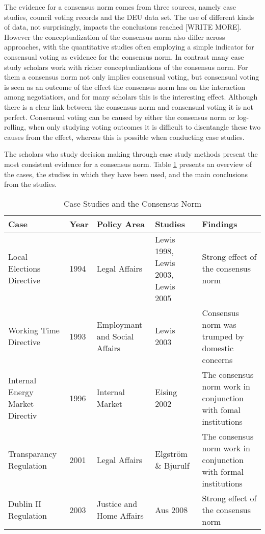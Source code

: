 The evidence for a consensus norm comes from three sources, namely case studies, council voting records and the DEU data set. The use of different kinds of data, not surprisingly, impacts the conclusions reached [WRITE MORE]. However the conceptualization of the consensus norm also differ across approaches, with the quantitative studies often employing a simple indicator for consensual voting as evidence for the consensus norm. In contrast many case study scholars work with richer conceptualizations of the consensus norm. For them a consensus norm not only implies consensual voting, but consensual voting is seen as an outcome of the effect the consensus norm has on the interaction among negotiatiors, and for many scholars this is the interesting effect. Although there is a clear link between the consensus norm and consensual voting it is not perfect. Consensual voting can be caused by either the consensus norm or log-rolling, when only studying voting outcomes it is difficult to disentangle these two causes from the effect, whereas this is possible when conducting case studies. 

The scholars who study decision making through case study methods present the most consistent evidence for a consensus norm. Table \ref{tab:casestudies} presents an overview of the cases, the studies in which they have been used, and the main conclusions from the studies. 

\begin{table}[htp]
  \centering
  \begin{tabular}{p{3cm} l p{3cm}  p{3cm} p{3cm}} \hline
    Case & Year & Policy Area & Studies & Findings \\ \hline
    Local Elections Directive & 1994 & Legal Affairs & Lewis 1998, Lewis 2003, Lewis 2005 & Strong effect of the consensus norm \\
    Working Time Directive & 1993 & Employmant and Social Affairs & Lewis 2003 & Consensus norm was trumped by domestic concerns \\
    Internal Energy Market Directiv & 1996 & Internal Market & Eising 2002 & The consensus norm work in conjunction with fomal institutions \\
    Transparancy Regulation & 2001 & Legal Affairs & Elgstr\"{o}m \& Bjurulf & The consensus norm work in conjunction with formal institutions \\
   Dublin II Regulation & 2003 & Justice and Home Affairs &Aus 2008 & Strong effect of the consensus norm \\ \hline 
  \end{tabular}
  \caption{Case Studies and the Consensus Norm}
  \label{tab:casestudies}
\end{table}


